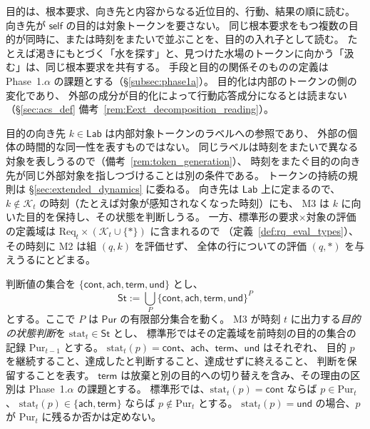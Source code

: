 \begin{remark}[目的の階層と入れ子]
\label{rem:purpose_hierarchy}
目的は、根本要求、向き先と内容からなる近位目的、行動、結果の順に読む。
向き先が $\mathsf{self}$ の目的は対象トークンを要さない。
同じ根本要求をもつ複数の目的が同時に、または時刻をまたいで並ぶことを、目的の入れ子として読む。
たとえば渇きにもとづく「水を探す」と、見つけた水場のトークンに向かう「汲む」は、同じ根本要求を共有する。
手段と目的の関係そのものの定義は Phase~1.$\alpha$ の課題とする（\S\ref{subsec:phase1a}）。
目的化は内部のトークンの側の変化であり、
外部の成分が目的化によって行動応答成分になるとは読まない
（\S\ref{sec:acs_def} 備考~\ref{rem:Eext_decomposition_reading}）。
\end{remark}

\begin{remark}[目的の向き先と内部対象トークン]
\label{rem:purpose_direction_token}
目的の向き先 $k\in\mathsf{Lab}$ は内部対象トークンのラベルへの参照であり、
外部の個体の時間的な同一性を表すものではない。
同じラベルは時刻をまたいで異なる対象を表しうるので（備考~\ref{rem:token_generation}）、
時刻をまたぐ目的の向き先が同じ外部対象を指しつづけることは別の条件である。
トークンの持続の規則は \S\ref{sec:extended_dynamics} に委ねる。
向き先は $\mathsf{Lab}$ 上に定まるので、
$k\notin\mathcal K_t$ の時刻（たとえば対象が感知されなくなった時刻）にも、
M3 は $k$ に向いた目的を保持し、その状態を判断しうる。
一方、標準形の要求×対象の評価の定義域は $\mathrm{Req}_t\times(\mathcal K_t\cup\{\ast\})$ に含まれるので
（定義~\ref{def:rq_eval_types}）、その時刻に M2 は組 $(q,k)$ を評価せず、
全体の行についての評価 $(q,\ast)$ を与えうるにとどまる。
\end{remark}

\begin{definition}
\label{def:purpose_status}
判断値の集合を $\{\mathsf{cont},\mathsf{ach},\mathsf{term},\mathsf{und}\}$ とし、
\[
  \mathsf{St}:=\bigcup_{P}\{\mathsf{cont},\mathsf{ach},\mathsf{term},\mathsf{und}\}^{P}
\]
とする。ここで $P$ は $\mathsf{Pur}$ の有限部分集合を動く。
M3 が時刻 $t$ に出力する\emph{目的の状態判断}を $\mathrm{stat}_t\in\mathsf{St}$ とし、
標準形ではその定義域を前時刻の目的の集合の記録 $\mathrm{Pur}_{t-1}$ とする。
$\mathrm{stat}_t(p)=\mathsf{cont}$、$\mathsf{ach}$、$\mathsf{term}$、$\mathsf{und}$ はそれぞれ、
目的 $p$ を継続すること、達成したと判断すること、達成せずに終えること、
判断を保留することを表す。
$\mathsf{term}$ は放棄と別の目的への切り替えを含み、その理由の区別は Phase~1.$\alpha$ の課題とする。
標準形では、$\mathrm{stat}_t(p)=\mathsf{cont}$ ならば $p\in\mathrm{Pur}_t$、
$\mathrm{stat}_t(p)\in\{\mathsf{ach},\mathsf{term}\}$ ならば $p\notin\mathrm{Pur}_t$ とする。
$\mathrm{stat}_t(p)=\mathsf{und}$ の場合、$p$ が $\mathrm{Pur}_t$ に残るか否かは定めない。
\end{definition}

